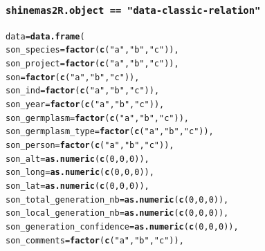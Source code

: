 \documentclass{article}\usepackage[]{graphicx}\usepackage[]{color}
\makeatletter
\newcommand{\hlnum}[1]{\textcolor[rgb]{0.686,0.059,0.569}{#1}}%
\newcommand{\hlstr}[1]{\textcolor[rgb]{0.192,0.494,0.8}{#1}}%
\newcommand{\hlstd}[1]{\textcolor[rgb]{0.345,0.345,0.345}{#1}}%
\newcommand{\hlkwb}[1]{\textcolor[rgb]{0.69,0.353,0.396}{#1}}%
\newcommand{\hlkwc}[1]{\textcolor[rgb]{0.333,0.667,0.333}{#1}}%
\newcommand{\hlkwd}[1]{\textcolor[rgb]{0.737,0.353,0.396}{\textbf{#1}}}%
\newenvironment{kframe}{%
 \def\at@end@of@kframe{}%
 \ifinner\ifhmode%
  \def\at@end@of@kframe{\end{minipage}}%
  \begin{minipage}{\columnwidth}%
 \fi\fi%
 \def\FrameCommand##1{\hskip\@totalleftmargin \hskip-\fboxsep
 \colorbox{shadecolor}{##1}\hskip-\fboxsep
     \hskip-\linewidth \hskip-\@totalleftmargin \hskip\columnwidth}%
 \MakeFramed {\advance\hsize-\width
   \@totalleftmargin\z@ \linewidth\hsize
   \@setminipage}}%
 {\par\unskip\endMakeFramed%
 \at@end@of@kframe}
\newenvironment{knitrout}{}{} %
\makeatother
\begin{document}
\begin{appendices}
\begin{knitrout}
\begin{kframe}
{\ttfamily\noindent\itshape{}}\end{kframe}
\end{knitrout}

\subsubsection{\texttt{shinemas2R.object == "data-classic-relation"}}

\begin{knitrout}
\color{fgcolor}\begin{kframe}
\begin{alltt}
\hlstd{data} \hlkwb{=} \hlkwd{data.frame}\hlstd{(}
        \hlkwc{son_species} \hlstd{=} \hlkwd{factor}\hlstd{(}\hlkwd{c}\hlstd{(}\hlstr{"a"}\hlstd{,} \hlstr{"b"}\hlstd{,} \hlstr{"c"}\hlstd{)),}
        \hlkwc{son_project} \hlstd{=} \hlkwd{factor}\hlstd{(}\hlkwd{c}\hlstd{(}\hlstr{"a"}\hlstd{,} \hlstr{"b"}\hlstd{,} \hlstr{"c"}\hlstd{)),}
        \hlkwc{son} \hlstd{=} \hlkwd{factor}\hlstd{(}\hlkwd{c}\hlstd{(}\hlstr{"a"}\hlstd{,} \hlstr{"b"}\hlstd{,} \hlstr{"c"}\hlstd{)),}
        \hlkwc{son_ind} \hlstd{=} \hlkwd{factor}\hlstd{(}\hlkwd{c}\hlstd{(}\hlstr{"a"}\hlstd{,} \hlstr{"b"}\hlstd{,} \hlstr{"c"}\hlstd{)),}
        \hlkwc{son_year} \hlstd{=} \hlkwd{factor}\hlstd{(}\hlkwd{c}\hlstd{(}\hlstr{"a"}\hlstd{,} \hlstr{"b"}\hlstd{,} \hlstr{"c"}\hlstd{)),}
        \hlkwc{son_germplasm} \hlstd{=} \hlkwd{factor}\hlstd{(}\hlkwd{c}\hlstd{(}\hlstr{"a"}\hlstd{,} \hlstr{"b"}\hlstd{,} \hlstr{"c"}\hlstd{)),}
        \hlkwc{son_germplasm_type} \hlstd{=} \hlkwd{factor}\hlstd{(}\hlkwd{c}\hlstd{(}\hlstr{"a"}\hlstd{,} \hlstr{"b"}\hlstd{,} \hlstr{"c"}\hlstd{)),}
        \hlkwc{son_person} \hlstd{=} \hlkwd{factor}\hlstd{(}\hlkwd{c}\hlstd{(}\hlstr{"a"}\hlstd{,} \hlstr{"b"}\hlstd{,} \hlstr{"c"}\hlstd{)),}
        \hlkwc{son_alt} \hlstd{=} \hlkwd{as.numeric}\hlstd{(}\hlkwd{c}\hlstd{(}\hlnum{0}\hlstd{,} \hlnum{0}\hlstd{,} \hlnum{0}\hlstd{)),}
        \hlkwc{son_long} \hlstd{=} \hlkwd{as.numeric}\hlstd{(}\hlkwd{c}\hlstd{(}\hlnum{0}\hlstd{,} \hlnum{0}\hlstd{,} \hlnum{0}\hlstd{)),}
        \hlkwc{son_lat} \hlstd{=} \hlkwd{as.numeric}\hlstd{(}\hlkwd{c}\hlstd{(}\hlnum{0}\hlstd{,} \hlnum{0}\hlstd{,} \hlnum{0}\hlstd{)),}
        \hlkwc{son_total_generation_nb} \hlstd{=} \hlkwd{as.numeric}\hlstd{(}\hlkwd{c}\hlstd{(}\hlnum{0}\hlstd{,} \hlnum{0}\hlstd{,} \hlnum{0}\hlstd{)),}
        \hlkwc{son_local_generation_nb} \hlstd{=} \hlkwd{as.numeric}\hlstd{(}\hlkwd{c}\hlstd{(}\hlnum{0}\hlstd{,} \hlnum{0}\hlstd{,} \hlnum{0}\hlstd{)),}
        \hlkwc{son_generation_confidence} \hlstd{=} \hlkwd{as.numeric}\hlstd{(}\hlkwd{c}\hlstd{(}\hlnum{0}\hlstd{,} \hlnum{0}\hlstd{,} \hlnum{0}\hlstd{)),}
        \hlkwc{son_comments} \hlstd{=} \hlkwd{factor}\hlstd{(}\hlkwd{c}\hlstd{(}\hlstr{"a"}\hlstd{,} \hlstr{"b"}\hlstd{,} \hlstr{"c"}\hlstd{)),}


\end{alltt}
\end{kframe}
\end{knitrout}
\end{appendices}
\end{document}
